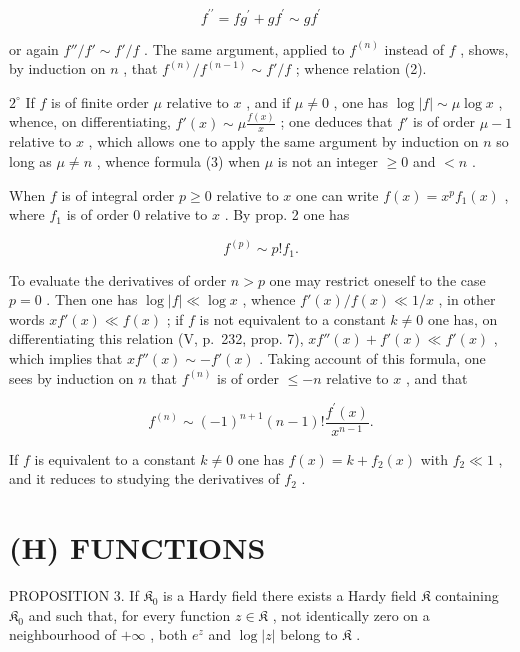 \[
f ^ {\prime \prime} = f g ^ {\prime} + g f ^ {\prime} \sim g f ^ {\prime}
\]

or again \(f'' / f' \sim f' / f\) . The same argument, applied to \(f^{(n)}\) instead of \(f\) , shows, by induction on \(n\) , that \(f^{(n)} / f^{(n-1)} \sim f' / f\) ; whence relation (2).

\(2^{\circ}\) If \(f\) is of finite order \(\mu\) relative to \(x\) , and if \(\mu \neq 0\) , one has \(\log |f| \sim \mu \log x\) , whence, on differentiating, \(f'(x) \sim \mu \frac{f(x)}{x}\) ; one deduces that \(f'\) is of order \(\mu - 1\) relative to \(x\) , which allows one to apply the same argument by induction on \(n\) so long as \(\mu \neq n\) , whence formula (3) when \(\mu\) is not an integer \(\geqslant 0\) and \(< n\) .

When \(f\) is of integral order \(p \geqslant 0\) relative to \(x\) one can write \(f(x) = x^p f_1(x)\) , where \(f_1\) is of order 0 relative to \(x\) . By prop. 2 one has

\[
f ^ {(p)} \sim p! f _ {1}.
\]

To evaluate the derivatives of order \(n > p\) one may restrict oneself to the case \(p = 0\) . Then one has \(\log |f| \ll \log x\) , whence \(f'(x) / f(x) \ll 1 / x\) , in other words \(xf'(x) \ll f(x)\) ; if \(f\) is not equivalent to a constant \(k \neq 0\) one has, on differentiating this relation (V, p.~232, prop. 7), \(xf''(x) + f'(x) \ll f'(x)\) , which implies that \(xf''(x) \sim -f'(x)\) . Taking account of this formula, one sees by induction on \(n\) that \(f^{(n)}\) is of order \(\leqslant -n\) relative to \(x\) , and that

\[
f ^ {(n)} \sim (- 1) ^ {n + 1} (n - 1)! \frac {f ^ {\prime} (x)}{x ^ {n - 1}}.\tag{4}
\]

If \(f\) is equivalent to a constant \(k \neq 0\) one has \(f(x) = k + f_2(x)\) with \(f_2 \ll 1\) , and it reduces to studying the derivatives of \(f_2\) .

\section{(H) FUNCTIONS}

PROPOSITION 3. If \(\mathfrak{K}_0\) is a Hardy field there exists a Hardy field \(\mathfrak{K}\) containing \(\mathfrak{K}_0\) and such that, for every function \(z \in \mathfrak{K}\) , not identically zero on a neighbourhood of \(+\infty\) , both \(e^z\) and \(\log |z|\) belong to \(\mathfrak{K}\) .

